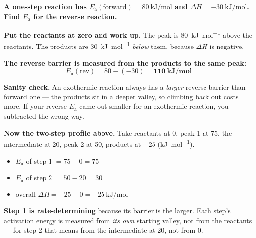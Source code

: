 \documentclass{apchem-worksheet}
\begin{document}
\begin{workedexample}
\textbf{A one-step reaction has $E_{\mathrm{a}}(\text{forward}) =
\SI{80}{\kilo\joule\per\mole}$ and $\Delta H =
\SI{-30}{\kilo\joule\per\mole}$. Find $E_{\mathrm{a}}$ for the reverse
reaction.}

\textbf{Put the reactants at zero and work up.} The peak is
\SI{80}{\kilo\joule\per\mole} above the reactants. The products are
\SI{30}{\kilo\joule\per\mole} \emph{below} them, because $\Delta H$ is
negative.

\textbf{The reverse barrier is measured from the products to the same
peak:}
\[ E_{\mathrm{a}}(\text{rev}) = 80 - (-30)
   = \mathbf{\SI{110}{\kilo\joule\per\mole}} \]

\textbf{Sanity check.} An exothermic reaction always has a
\emph{larger} reverse barrier than forward one --- the products sit in a
deeper valley, so climbing back out costs more. If your reverse
$E_{\mathrm{a}}$ came out smaller for an exothermic reaction, you
subtracted the wrong way.

\textbf{Now the two-step profile above.} Take reactants at 0, peak 1 at
75, the intermediate at 20, peak 2 at 50, products at $-25$
(\si{\kilo\joule\per\mole}).
\begin{itemize}[leftmargin=1.4em,itemsep=0.15em]
  \item $E_{\mathrm{a}}$ of step 1 $= 75 - 0 = \SI{75}{}$
  \item $E_{\mathrm{a}}$ of step 2 $= 50 - 20 = \SI{30}{}$
  \item overall $\Delta H = -25 - 0 = \SI{-25}{\kilo\joule\per\mole}$
\end{itemize}
\textbf{Step 1 is rate-determining} because its barrier is the larger.
Each step's activation energy is measured from \emph{its own} starting
valley, not from the reactants --- for step 2 that means from the
intermediate at 20, not from 0.
\end{workedexample}
\end{document}
